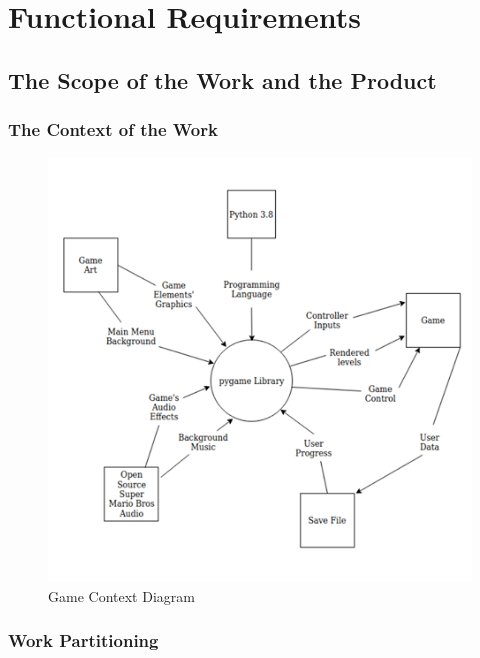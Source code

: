 \documentclass[12pt, titlepage]{article}
\begin{document}
\section{Functional Requirements}

\subsection{The Scope of the Work and the Product}

\subsubsection{The Context of the Work}

\begin{figure}[H]
    \centering
    \includegraphics[width=\textwidth]{SRScontextdiagram.png}
    \caption{Game Context Diagram}
    \label{fig:contextdiagram}
\end{figure}

\subsubsection{Work Partitioning}
\end{document}
